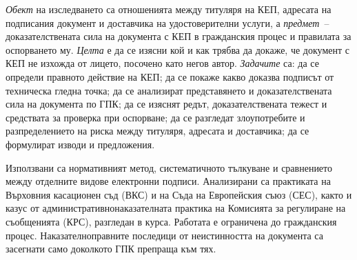 \textit{Обект} на изследването са отношенията между титуляря на КЕП, адресата на
подписания документ и доставчика на удостоверителни услуги, а \textit{предмет}~--
доказателствената сила на документа с КЕП в гражданския процес и правилата за
оспорването му. \textit{Целта} е да се изясни кой и как трябва да докаже, че документ с
КЕП не изхожда от лицето, посочено като негов автор. \textit{Задачите} са: да се определи
правното действие на КЕП; да се покаже какво доказва подписът от техническа гледна точка;
да се анализират представянето и доказателствената сила на документа по ГПК; да се
изяснят редът, доказателствената тежест и средствата за проверка при оспорване; да се
разгледат злоупотребите и разпределението на риска между титуляря, адресата и доставчика;
да се формулират изводи и предложения.

Използвани са нормативният метод, систематичното тълкуване и сравнението между отделните
видове електронни подписи. Анализирани са практиката на Върховния касационен съд (ВКС) и
на Съда на Европейския съюз (СЕС), както и казус от административнонаказателната практика
на Комисията за регулиране на съобщенията (КРС), разгледан в курса. Работата е ограничена
до гражданския процес. Наказателноправните последици от неистинността на документа са
засегнати само доколкото ГПК препраща към тях.
